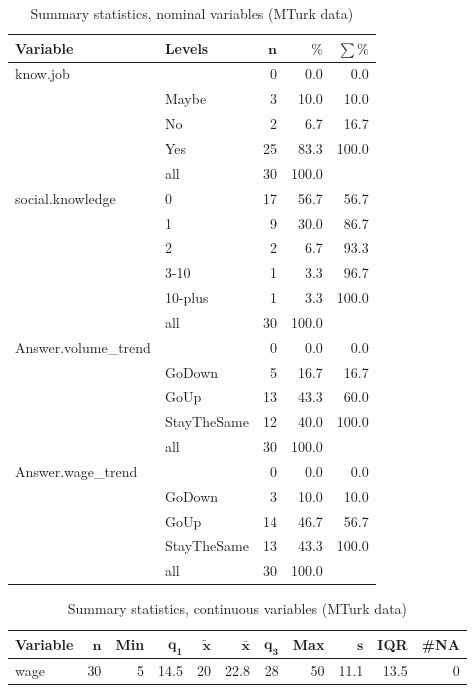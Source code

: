 \documentclass[a4paper,10pt]{article}\usepackage[]{graphicx}\usepackage[]{color}
\begin{document}
\begin{table}[ht]
\centering
{\footnotesize
\begin{tabular}{ll|rrr}
 \textbf{Variable} & \textbf{Levels} & $\mathbf{n}$ & $\mathbf{\%}$ & $\mathbf{\sum \%}$ \\ 
  \hline
know.job &  & 0 & 0.0 & 0.0 \\ 
   & Maybe & 3 & 10.0 & 10.0 \\ 
   & No & 2 & 6.7 & 16.7 \\ 
   & Yes & 25 & 83.3 & 100.0 \\ 
   \hline
 & all & 30 & 100.0 &  \\ 
   \hline
\hline
social.knowledge & 0 & 17 & 56.7 & 56.7 \\ 
   & 1 & 9 & 30.0 & 86.7 \\ 
   & 2 & 2 & 6.7 & 93.3 \\ 
   & 3-10 & 1 & 3.3 & 96.7 \\ 
   & 10-plus & 1 & 3.3 & 100.0 \\ 
   \hline
 & all & 30 & 100.0 &  \\ 
   \hline
\hline
Answer.volume\_trend &  & 0 & 0.0 & 0.0 \\ 
   & GoDown & 5 & 16.7 & 16.7 \\ 
   & GoUp & 13 & 43.3 & 60.0 \\ 
   & StayTheSame & 12 & 40.0 & 100.0 \\ 
   \hline
 & all & 30 & 100.0 &  \\ 
   \hline
\hline
Answer.wage\_trend &  & 0 & 0.0 & 0.0 \\ 
   & GoDown & 3 & 10.0 & 10.0 \\ 
   & GoUp & 14 & 46.7 & 56.7 \\ 
   & StayTheSame & 13 & 43.3 & 100.0 \\ 
   \hline
 & all & 30 & 100.0 &  \\ 
   \hline
\hline
\end{tabular}
}
\caption{Summary statistics, nominal variables (MTurk data)} 
\label{tab1:47-2070}
\end{table}
\begin{table}[ht]
\centering
{\footnotesize
\begin{tabular}{lrrrrrrrrrr}
 \textbf{Variable} & $\mathbf{n}$ & \textbf{Min} & $\mathbf{q_1}$ & $\mathbf{\widetilde{x}}$ & $\mathbf{\bar{x}}$ & $\mathbf{q_3}$ & \textbf{Max} & $\mathbf{s}$ & \textbf{IQR} & \textbf{\#NA} \\ 
  \hline
wage & 30 & 5 & 14.5 & 20 & 22.8 & 28 & 50 & 11.1 & 13.5 & 0 \\ 
  \end{tabular}
}
\caption{Summary statistics, continuous variables (MTurk data)} 
\label{tab2:47-2070}
\end{table}
\end{document}
